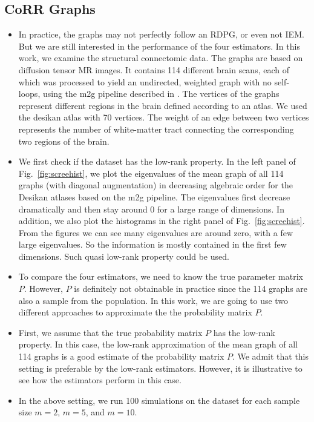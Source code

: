 \documentclass[a4paper]{article}
\begin{document}
\subsection{CoRR Graphs}
\label{section:real_data}
\begin{itemize}
\item In practice, the graphs may not perfectly follow an RDPG, or even not IEM. But we are still interested in the performance of the four estimators. In this work, we examine the structural connectomic data. The graphs are based on diffusion tensor MR
images. It contains 114 different brain scans, each of which was processed to yield an undirected, weighted graph with no
self-loops, using the m2g pipeline described in \citet{kiar2016ndmg}. The vertices of the graphs represent different regions in the brain defined according to an atlas. We used the desikan atlas with 70 vertices. The weight of an edge between two vertices represents the number of white-matter tract connecting the corresponding two regions of the brain.
\item We first check if the dataset has the low-rank property. In the left panel of Fig.~\ref{fig:screehist}, we plot the eigenvalues of the mean graph of all 114 graphs (with diagonal augmentation) in decreasing algebraic order for the Desikan atlases based on the m2g pipeline. The eigenvalues first decrease dramatically and then stay around 0 for a large range of dimensions. In addition, we also plot the histograms in the right panel of Fig.~\ref{fig:screehist}. From the figures we can see many eigenvalues are around zero, with a few large eigenvalues. So the information is mostly contained in the first few dimensions. Such quasi low-rank property could be used.
\item To compare the four estimators, we need to know the true parameter matrix $P$. However, $P$ is definitely not obtainable in practice since the 114 graphs are also a sample from the population. In this work, we are going to use two different approaches to approximate the the probability matrix $P$.
\item First, we assume that the true probability matrix $P$ has the low-rank property. In this case, the low-rank approximation of the mean graph of all 114 graphs is a good estimate of the probability matrix $P$.
We admit that this setting is preferable by the low-rank estimators. However, it is illustrative to see how the estimators perform in this case.
\item In the above setting, we run 100 simulations on the dataset for each sample size $m = 2$, $m = 5$, and $m = 10$.

\end{itemize}
\end{document}
